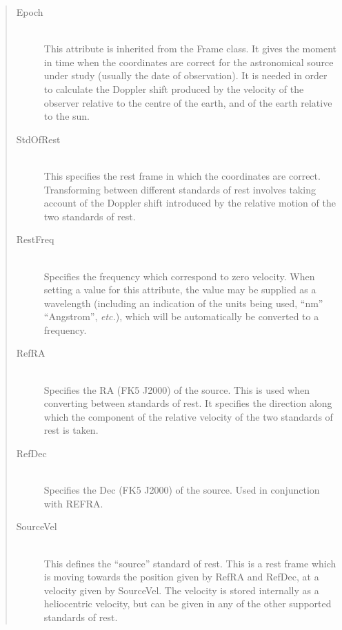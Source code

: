 \documentclass[twoside,11pt]{article}
\begin{document}
\begin{quote}
\begin{description}

\item[Epoch]\mbox{}\\
This attribute is inherited from the Frame class. It gives the moment in
time when the coordinates are correct for the astronomical source
under study (usually the date of observation). It is needed in order to
calculate the Doppler shift produced by the velocity of the observer
relative to the centre of the earth, and of the earth relative to the sun.

\item[StdOfRest]\mbox{}\\
This specifies the rest frame in which the coordinates are correct.
Transforming between different standards of rest involves taking account
of the Doppler shift introduced by the relative motion of the two
standards of rest.

\item[RestFreq]\mbox{}\\
Specifies the frequency which correspond to zero velocity. When setting a
value for this attribute, the value may be supplied as a wavelength
(including an indication of the units being used, ``nm'' ``Angstrom'',
\emph{etc.}), which will be automatically be converted to a frequency.

\item[RefRA]\mbox{}\\
Specifies the RA (FK5 J2000) of the source. This is used when converting
between standards of rest. It specifies the direction along which the
component of the relative velocity of the two standards of rest is taken.

\item[RefDec]\mbox{}\\
Specifies the Dec (FK5 J2000) of the source. Used in conjunction with
REFRA.

\item[SourceVel]\mbox{}\\
This defines the ``source'' standard of rest. This is a rest frame which
is moving towards the position given by RefRA and RefDec, at a velocity
given by SourceVel. The velocity is stored internally as a heliocentric
velocity, but can be given in any of the other supported standards of rest.

\end{description}
\end{quote}
\end{document}
